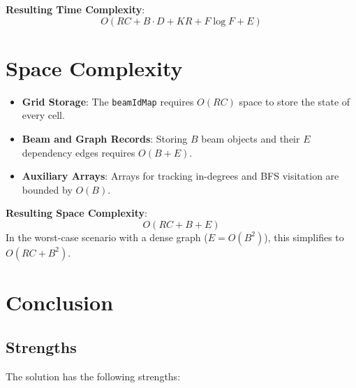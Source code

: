 \documentclass[runningheads]{llncs}
\begin{document}
\textbf{Resulting Time Complexity}: 
\[ O(RC + B \cdot D + KR + F \log F + E) \]

\section{Space Complexity}

\begin{itemize}
    \item \textbf{Grid Storage}: The \texttt{beamIdMap} requires $O(RC)$ space to store the state of every cell.
    \item \textbf{Beam and Graph Records}: Storing $B$ beam objects and their $E$ dependency edges requires $O(B + E)$.
    \item \textbf{Auxiliary Arrays}: Arrays for tracking in-degrees and BFS visitation are bounded by $O(B)$.
\end{itemize}

\textbf{Resulting Space Complexity}: 
\[ O(RC + B + E) \]
In the worst-case scenario with a dense graph ($E = O(B^2)$), this simplifies to $O(RC + B^2)$.

\section{Conclusion}

  \subsection{Strengths}

  The solution has the following strengths:
\end{document}
